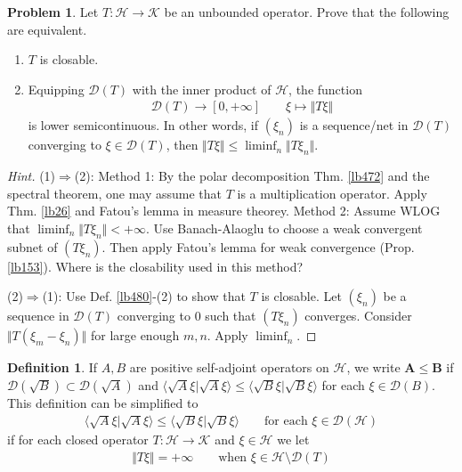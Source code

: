 \documentclass[12pt,b5paper,notitlepage]{article}
\theoremstyle{definition}
\newtheorem{df}{Definition}[subsection]
\newtheorem{prob}{\color{red}Problem}[section]
\theoremstyle{plain}
\newcommand{\Dom}{\mathscr{D}}
\newcommand{\bk}[1]{\langle {#1}\rangle}
\newcommand{\MH}{\mathcal H}
\newcommand{\MK}{\mathcal K}
\numberwithin{equation}{section}
\begin{document}
\begin{prob}
Let $T:\MH\rightarrow\MK$ be an unbounded operator. Prove that the following are equivalent.
\begin{enumerate}
\item[(1)] $T$ is closable.
\item[(2)] Equipping $\Dom(T)$ with the inner product of $\MH$, the function
\begin{align*}
\Dom(T)\rightarrow[0,+\infty]\qquad \xi\mapsto \Vert T\xi\Vert
\end{align*} 
is lower semicontinuous. In other words, if $(\xi_n)$ is a sequence/net in $\Dom(T)$ converging to $\xi\in\Dom(T)$, then $\Vert T\xi\Vert\leq\liminf_n\Vert T\xi_n\Vert$.
\end{enumerate}
\end{prob}


\begin{proof}[Hint]
(1)$\Rightarrow$(2): Method 1: By the polar decomposition Thm. \ref{lb472} and the spectral theorem, one may assume that $T$ is a multiplication operator. Apply Thm. \ref{lb26} and Fatou's lemma in measure theorey. Method 2: Assume WLOG that $\liminf_n\Vert T\xi_n\Vert<+\infty$. Use Banach-Alaoglu to choose a weak convergent subnet of $(T\xi_n)$. Then apply Fatou's lemma for weak convergence (Prop. \ref{lb153}). Where is the closability used in this method?

(2)$\Rightarrow$(1): Use Def. \ref{lb480}-(2) to show that $T$ is closable. Let $(\xi_n)$ be a sequence in $\Dom(T)$ converging to $0$ such that $(T\xi_n)$ converges. Consider $\Vert T(\xi_m-\xi_n)\Vert$ for large enough $m,n$. Apply $\liminf_n$.
\end{proof}

\begin{df}
If $A,B$ are positive self-adjoint operators on $\MH$, we write $\pmb{A\leq B}$  if $\Dom(\sqrt B)\subset\Dom(\sqrt A)$ and $\bk{\sqrt A\xi|\sqrt A\xi}\leq\bk{\sqrt B\xi|\sqrt B\xi}$ for each $\xi\in\Dom(B)$. This definition can be simplified to
\begin{align*}
\bk{\sqrt A\xi|\sqrt A\xi}\leq\bk{\sqrt B\xi|\sqrt B\xi}\qquad\text{for each }\xi\in\Dom(\MH)
\end{align*}
if for each closed operator $T:\MH\rightarrow\MK$ and $\xi\in\MH$ we let
\begin{align*}
\Vert T\xi\Vert=+\infty\qquad\text{when }\xi\in\MH\setminus\Dom(T)
\end{align*}
\end{df}
\end{document}
